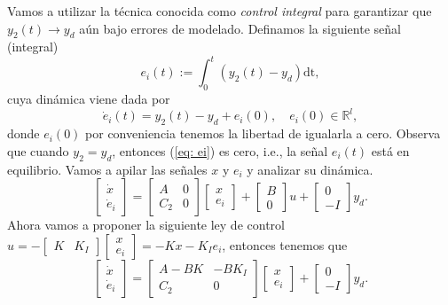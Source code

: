Vamos a utilizar la técnica conocida como \emph{control integral} para garantizar que $y_2(t) \to y_d$ aún bajo errores de modelado. Definamos la siguiente señal (integral)
\begin{equation}
	e_i(t) := \int_0^t (y_2(t) - y_d) \mathrm{dt},
	\label{eq: ei}
\end{equation}
cuya dinámica viene dada por
\begin{equation}
	\dot e_i(t) = y_2(t) - y_d + e_i(0), \quad e_i(0)\in\mathbb{R}^l,
	\label{eq: dei}
\end{equation}
donde $e_i(0)$ por conveniencia tenemos la libertad de igualarla a cero. Observa que cuando $y_2 = y_d$, entonces (\ref{eq: ei}) es cero, i.e., la señal $e_i(t)$ está en equilibrio. Vamos a apilar las señales $x$ y $e_i$ y analizar su dinámica.
\begin{equation}
	\begin{bmatrix}\dot x \\ \dot e_i\end{bmatrix} = \begin{bmatrix}A & 0 \\ C_2 & 0\end{bmatrix}\begin{bmatrix}x \\ e_i\end{bmatrix} + \begin{bmatrix}B \\ 0 \end{bmatrix} u + \begin{bmatrix}0 \\ -I\end{bmatrix} y_d.
	\label{eq: xei}
\end{equation}
Ahora vamos a proponer la siguiente ley de control $u = -\begin{bmatrix}K & K_I\end{bmatrix}\begin{bmatrix}x \\ e_i \end{bmatrix} = -Kx -K_Ie_i$, entonces tenemos que
	\begin{equation}
	\begin{bmatrix}\dot x \\ \dot e_i \end{bmatrix} = \begin{bmatrix}A-BK & -BK_I \\ C_2 & 0\end{bmatrix}\begin{bmatrix} x \\ e_i \end{bmatrix} + \begin{bmatrix}0 \\ -I\end{bmatrix} y_d.
	\label{eq: xeta2}
	\end{equation}

